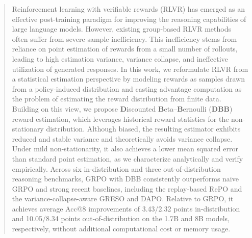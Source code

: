 \begin{abstract}
Reinforcement learning with verifiable rewards (RLVR) has emerged as an effective post-training paradigm for improving the reasoning capabilities of large language models.
However, existing group-based RLVR methods often suffer from severe sample inefficiency.
This inefficiency stems from reliance on point estimation of rewards from a small number of rollouts, leading to high estimation variance, variance collapse, and ineffective utilization of generated responses.
In this work, we reformulate RLVR from a statistical estimation perspective by modeling rewards as samples drawn from a policy-induced distribution and casting advantage computation as the problem of estimating the reward distribution from finite data.
Building on this view, we propose \textbf{D}iscounted \textbf{B}eta--\textbf{B}ernoulli (\textbf{DBB}) reward estimation, which leverages historical reward statistics for the non-stationary distribution.
Although biased, the resulting estimator exhibits reduced and stable variance and theoretically avoids variance collapse.
Under mild non-stationarity, it also achieves a lower mean squared error than standard point estimation, as we characterize analytically and verify empirically.
Across six in-distribution and three out-of-distribution reasoning benchmarks, GRPO with DBB consistently outperforms naive GRPO and strong recent baselines, including the replay-based RePO and the variance-collapse-aware GRESO and DAPO.
Relative to GRPO, it achieves average Acc@8 improvements of 3.43/2.32 points in-distribution and 10.05/8.34 points out-of-distribution on the 1.7B and 8B models, respectively, without additional computational cost or memory usage.
\end{abstract}
